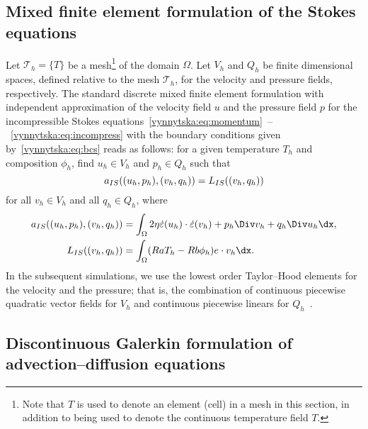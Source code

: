 \subsection{Mixed finite element formulation of the Stokes equations}

Let $\mathcal{T}_h = \{T\}$ be a mesh\footnote{Note that $T$ is used
to denote an element (cell) in a mesh in this section, in addition to
being used to denote the continuous temperature field $T$.} of the
domain $\Omega$. Let $V_h$ and $Q_h$ be finite dimensional spaces,
defined relative to the mesh $\mathcal{T}_h$, for the velocity and
pressure fields, respectively. The standard discrete mixed finite
element formulation with independent approximation of the
velocity field $u$ and the pressure field $p$ for the incompressible
Stokes
equations~\eqref{vynnytska:eq:momentum}~--~\eqref{vynnytska:eq:incompress}
with the boundary conditions given by~\eqref{vynnytska:eq:bcs} reads
as follows: for a given temperature $T_h$ and composition $\phi_h$,
find $u_h \in V_h$ and $p_h \in Q_h$ such that\vspace*{3pt}
\begin{equation}
\label{vynnytska:eq:mixed}
a_{IS} ( (u_h, p_h), (v_h, q_h) ) = L_{IS} ( (v_h, q_h) )\vspace*{4pt}
\end{equation}
for all $v_h \in V_h$ and all $q_h \in Q_h$, where
\begin{align}
  a_{IS} ( (u_h, p_h), (v_h, q_h) )
  & = \int_{\Omega} 2 \eta \dot {\varepsilon}(u_h)  \cdot \dot {\varepsilon}(v_h)
  + p_h \Div v_h + q_h \Div u_h \dx,
\\
  L_{IS} ( (v_h, q_h) ) &=
  \int_{\Omega} ( Ra T_h - Rb \phi_{h} ) e \cdot v_h  \dx.
\end{align}
In the subsequent simulations, we use the lowest order Taylor--Hood
elements for the velocity and the pressure; that is, the combination
of continuous piecewise quadratic vector fields for $V_h$ and
continuous piecewise linears for $Q_h$~\citep{TaylorHood1973}.


\subsection{Discontinuous Galerkin formulation of advection--diffusion equations}

